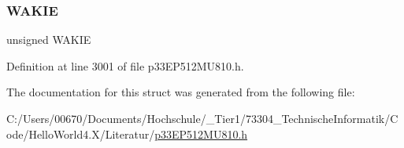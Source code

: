\subsubsection{\texorpdfstring{W\+A\+K\+IE}{WAKIE}}
{\footnotesize\ttfamily unsigned W\+A\+K\+IE}



Definition at line 3001 of file p33\+E\+P512\+M\+U810.\+h.



The documentation for this struct was generated from the following file\+:\begin{DoxyCompactItemize}
\item 
C\+:/\+Users/00670/\+Documents/\+Hochschule/\+\_\+\+Tier1/73304\+\_\+\+Technische\+Informatik/\+Code/\+Hello\+World4.\+X/\+Literatur/\hyperlink{p33_e_p512_m_u810_8h}{p33\+E\+P512\+M\+U810.\+h}\end{DoxyCompactItemize}
